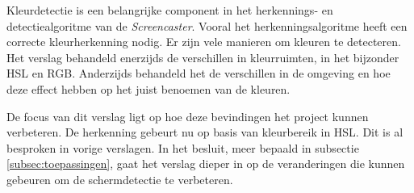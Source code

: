 
Kleurdetectie is een belangrijke component in het herkennings- en detectiealgoritme van de {\it Screencaster}. Vooral het herkenningsalgoritme heeft een correcte kleurherkenning nodig. Er zijn vele manieren om kleuren te detecteren. Het verslag behandeld enerzijds de verschillen in kleurruimten, in het bijzonder HSL en RGB. Anderzijds behandeld het de verschillen in de omgeving en hoe deze effect hebben op het juist benoemen van de kleuren.

De focus van dit verslag ligt op hoe deze bevindingen het project kunnen verbeteren. De herkenning gebeurt nu op basis van kleurbereik in HSL. Dit is al besproken in vorige verslagen. In het besluit, meer bepaald in subsectie \ref{subsec:toepassingen}, gaat het verslag dieper in op de veranderingen die kunnen gebeuren om de schermdetectie te verbeteren.